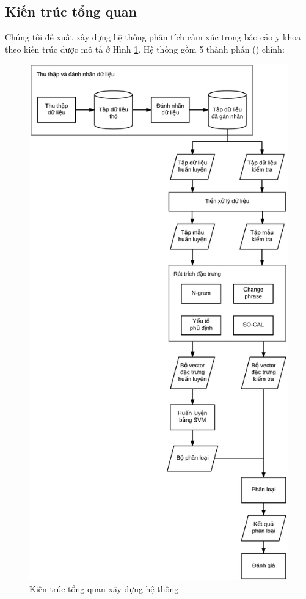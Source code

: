 \subsection{Kiến trúc tổng quan} \label{subsec:kien-truc-tong-quan}
Chúng tôi đề xuất xây dựng hệ thống phân tích cảm xúc trong báo cáo y khoa theo kiến trúc được mô tả ở Hình \ref{fig:tong-quan-xay-dung-he-thong}. Hệ thống gồm 5 thành phần () chính: \\

\begin{figure}[H]
\centering
\includegraphics[scale=0.3]{../hinh/Tongquan.png}
\caption{Kiến trúc tổng quan xây dựng hệ thống} \label{fig:tong-quan-xay-dung-he-thong}
\end{figure}

